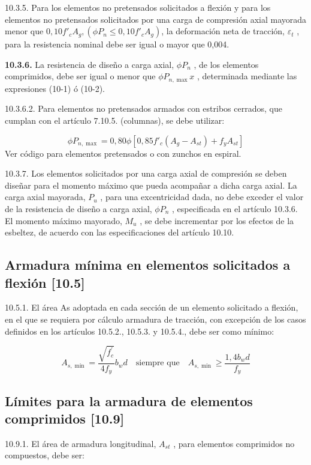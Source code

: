 \documentclass[twocolumn]{article}
\begin{document}
10.3.5. Para los elementos no pretensados solicitados a flexión y para los elementos no pretensados solicitados por una carga de compresión axial mayorada menor que $0,10 f'_c A_g, (\phi P_n \leq 0,10 f'_c A_g )$, la deformación neta de tracción, $\varepsilon_t$ , para la resistencia
nominal debe ser igual o mayor que 0,004.

\textbf{10.3.6.} La resistencia de diseño a carga axial, $\phi P_n$ , de los elementos comprimidos, debe ser igual o menor que $\phi P_{n,\max}x$ , determinada mediante las expresiones (10-1) ó (10-2).

10.3.6.2. Para elementos no pretensados armados con estribos cerrados, que cumplan con el artículo 7.10.5. (columnas), se debe utilizar:

\[
\phi P_{n, \max }=0,80 \phi\left[0,85 f'_{c}\left(A_{g}-A_{s t}\right)+f_{y} A_{s t}\right]
\]
Ver código para elementos pretensados o con zunchos en espiral.

10.3.7. Los elementos solicitados por una carga axial de compresión se deben diseñar para el momento máximo que pueda acompañar a dicha carga axial. La carga axial mayorada, $P_u$ , para una excentricidad dada, no debe exceder el valor de la resistencia de diseño a carga axial, $\phi P_n$ , especificada en el artículo 10.3.6. El momento máximo mayorado, $M_u$ , se debe incrementar por los efectos de la esbeltez, de acuerdo con las especificaciones del artículo 10.10.


\subsection{Armadura mínima en elementos solicitados a flexión [10.5]}

10.5.1. El área As adoptada en cada sección de un elemento solicitado a flexión, en el
que se requiera por cálculo armadura de tracción, con excepción de los casos definidos
en los artículos 10.5.2., 10.5.3. y 10.5.4., debe ser como mínimo:

\[
A_{s, \min }=\frac{\sqrt{f^{\prime}_c}}{4 f_{y}} b_{w} d \quad \text{siempre que} \quad A_{s, \min } \geq \frac{1,4 b_{w} d}{f_{y}}
\]

\subsection{Límites para la armadura de elementos comprimidos [10.9]}
10.9.1. El área de armadura longitudinal, $A_{st}$ , para elementos comprimidos no
compuestos, debe ser:
\end{document}
